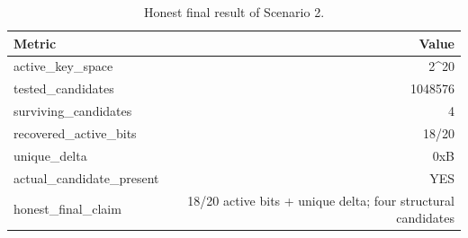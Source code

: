 \begin{table}[t]
\centering
\caption{Honest final result of Scenario 2.}
\label{tab:s2-structural}
\begin{tabular}{lr}
\toprule
Metric & Value \\
\midrule
active\_key\_space & 2^20 \\
tested\_candidates & 1048576 \\
surviving\_candidates & 4 \\
recovered\_active\_bits & 18/20 \\
unique\_delta & 0xB \\
actual\_candidate\_present & YES \\
honest\_final\_claim & 18/20 active bits + unique delta; four structural candidates \\
\bottomrule
\end{tabular}
\end{table}
